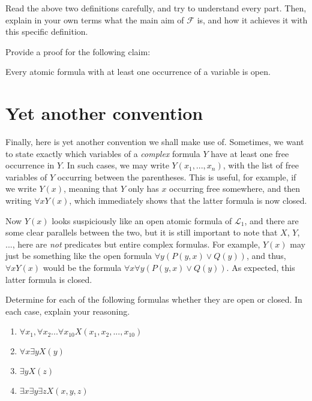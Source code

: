 \begin{exc}
Read the above two definitions carefully, and try to understand every part. Then, explain in your own terms what the main aim of $\mathcal{F}$ is, and how it achieves it with this specific definition. 
\end{exc}

\begin{defn}
Provide a proof for the following claim: 
\begin{center}Every atomic formula with at least one occurrence of a variable is open.
	\end{center}
\end{defn}

\section{Yet another convention}

Finally, here is yet another convention we shall make use of. Sometimes, we want to state exactly which variables of a \textit{complex} formula $Y$ have at least one free occurrence in $Y$. In such cases, we may write $Y(x_1, ..., x_n)$, with the list of free variables of $Y$ occurring between the parentheses. This is useful, for example, if we write $Y(x)$, meaning that $Y$ only has $x$ occurring free somewhere, and then writing $\forall x Y(x)$, which immediately shows that the latter formula is now closed. 

Now $Y(x)$ looks suspiciously like an open atomic formula of $\mathcal{L}_1$, and there are some clear parallels between the two, but it is still important to note that $X$, $Y$, ..., here are \textit{not} predicates but entire complex formulas. For example, $Y(x)$ may just be something like the open formula $\forall y(P(y, x) \vee Q(y))$, and thus, $\forall x Y(x)$ would be the formula $\forall x\forall y(P(y, x) \vee Q(y))$. As expected, this latter formula is closed. 

\begin{exc}
Determine for each of the following formulas whether they are open or closed. In each case, explain your reasoning. 

\begin{enumerate}
	\item $\forall x_1, \forall x_2 ... \forall x_{10} X(x_1, x_2, ..., x_{10})$
	\item $\forall x \exists y X(y)$
	\item $\exists y X(z)$
	\item $\exists x \exists y \exists z X(x, y, z)$
\end{enumerate}
\end{exc}